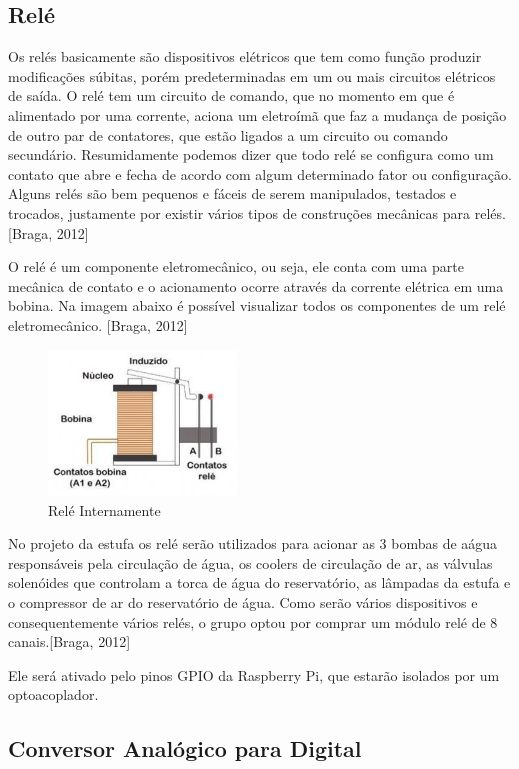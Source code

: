 \subsection{Relé}
Os relés basicamente são dispositivos elétricos que tem como função produzir modificações súbitas, porém predeterminadas em um ou mais circuitos elétricos de saída. O relé tem um circuito de comando, que no momento em que é alimentado por uma corrente, aciona um eletroímã que faz a mudança de posição de outro par de contatores, que estão ligados a um circuito ou comando secundário. Resumidamente podemos dizer que todo relé se configura como um contato que abre e fecha de acordo com algum determinado fator ou configuração. Alguns relés são bem pequenos e fáceis de serem manipulados, testados e trocados, justamente por existir vários tipos de construções mecânicas para relés. [Braga, 2012]

O relé é um componente eletromecânico, ou seja, ele conta com uma parte mecânica de contato e o acionamento ocorre através da corrente elétrica em uma bobina. Na imagem abaixo é possível visualizar todos os componentes de um relé eletromecânico. [Braga, 2012]

\begin{figure}[H]
	\centering
	\includegraphics[width=5cm]{figuras/rele.png}
	\caption{Relé Internamente} \label{rele}
\end{figure}

No projeto da estufa os relé serão utilizados para acionar as 3 bombas de aágua responsáveis pela circulação de água, os coolers de circulação de ar, as válvulas solenóides que controlam a torca de água do reservatório, as lâmpadas da estufa e o compressor de ar do reservatório de água.
Como serão vários dispositivos e consequentemente vários relés, o grupo optou por comprar um módulo relé de 8 canais.[Braga, 2012]

Ele será ativado pelo pinos GPIO da Raspberry Pi, que estarão isolados por um optoacoplador.


\subsection{Conversor Analógico para Digital}

